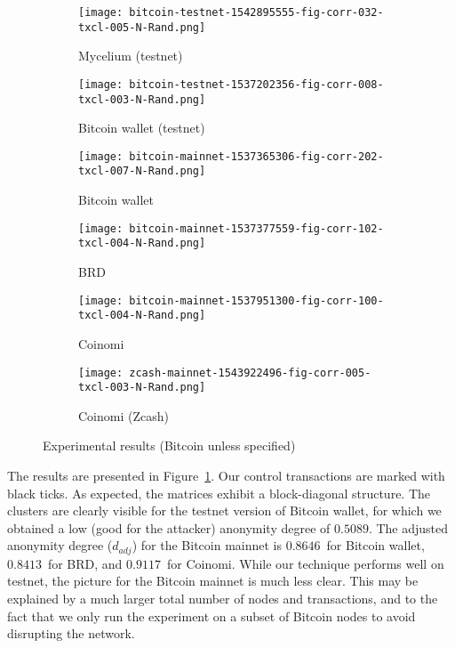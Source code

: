 \begin{figure}
	\centering
	\begin{subfigure}{.5\textwidth}
		\centering
		\texttt{[image: bitcoin-testnet-1542895555-fig-corr-032-txcl-005-N-Rand.png]}
		\caption{Mycelium (testnet)}
	\end{subfigure}%
	\begin{subfigure}{.5\textwidth}
		\centering
		\texttt{[image: bitcoin-testnet-1537202356-fig-corr-008-txcl-003-N-Rand.png]}
		\caption{Bitcoin wallet (testnet)}
	\end{subfigure}
	\begin{subfigure}{.5\textwidth}
		\centering
		\texttt{[image: bitcoin-mainnet-1537365306-fig-corr-202-txcl-007-N-Rand.png]}
		\caption{Bitcoin wallet}
	\end{subfigure}%
	\begin{subfigure}{.5\textwidth}
		\centering
		\texttt{[image: bitcoin-mainnet-1537377559-fig-corr-102-txcl-004-N-Rand.png]}
		\caption{BRD}
	\end{subfigure}
	\begin{subfigure}{.5\textwidth}
		\centering
		\texttt{[image: bitcoin-mainnet-1537951300-fig-corr-100-txcl-004-N-Rand.png]}
		\caption{Coinomi}
	\end{subfigure}%
	\begin{subfigure}{.5\textwidth}
		\centering
		\texttt{[image: zcash-mainnet-1543922496-fig-corr-005-txcl-003-N-Rand.png]}
		\caption{Coinomi (Zcash)}
	\end{subfigure}
	\caption[short]{Experimental results (Bitcoin unless specified)}
	\label{fig:clustering-all}
\end{figure}


The results are presented in Figure~\ref{fig:clustering-all}.
Our control transactions are marked with black ticks.
As expected, the matrices exhibit a block-diagonal structure.
The clusters are clearly visible for the testnet version of Bitcoin wallet, for which we obtained a low (good for the attacker) anonymity degree of $0.5089$.
The adjusted anonymity degree ($d_{adj}$) for the Bitcoin mainnet is $0.8646$~for Bitcoin wallet, $0.8413$~for BRD, and $0.9117$~for Coinomi.
While our technique performs well on testnet, the picture for the Bitcoin mainnet is much less clear.
This may be explained by a much larger total number of nodes and transactions, and to the fact that we only run the experiment on a subset of Bitcoin nodes to avoid disrupting the network.


